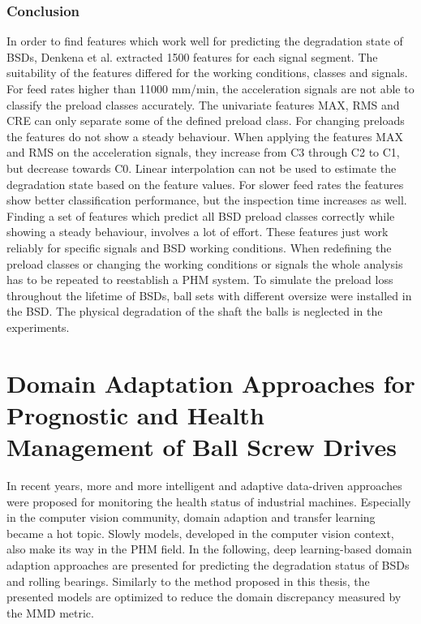 \subsubsection{Conclusion}
In order to find features which work well for predicting the degradation state of BSDs, Denkena et al. extracted 1500 features for each signal segment. The suitability of the features differed for the working conditions, classes and signals. For feed rates higher than 11000 mm/min, the acceleration signals are not able to classify the preload classes accurately. The univariate features MAX, RMS and CRE can only separate some of the defined preload class. For changing preloads the features do not show a steady behaviour. When applying the features MAX and RMS on the acceleration signals, they increase from C3 through C2 to C1, but decrease towards C0. Linear interpolation can not be used to estimate the degradation state based on the feature values. For slower feed rates the features show better classification performance, but the inspection time increases as well. Finding a set of features which predict all BSD preload classes correctly while showing a steady behaviour, involves a lot of effort. These features just work reliably for specific signals and BSD working conditions. When redefining the preload classes or changing the working conditions or signals the whole analysis has to be repeated to reestablish a PHM system. To simulate the preload loss throughout the lifetime of BSDs, ball sets with different oversize were installed in the BSD. The physical degradation of the shaft the balls is neglected in the experiments.

\section{Domain Adaptation Approaches for Prognostic and Health Management of Ball Screw Drives}
In recent years, more and more intelligent and adaptive data-driven approaches were proposed for monitoring the health status of industrial machines. Especially in the computer vision community, domain adaption and transfer learning became a hot topic. Slowly models, developed in the computer vision context, also make its way in the PHM field. In the following, deep learning-based domain adaption approaches are presented for predicting the degradation status of BSDs and rolling bearings. Similarly to the method proposed in this thesis, the presented models are optimized to reduce the domain discrepancy measured by the MMD metric.

